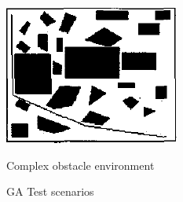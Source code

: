 \begin{figure}[h!]
\begin{minipage}{0.30\textwidth}
        \label{Intermediate obstacle environment}
    \end{minipage}
    \begin{minipage}{0.30\textwidth}
        \centering
        \includegraphics[width=\linewidth]{images/Chap1/R17_complex.png} %
        \caption{Complex obstacle environment}
        \label{Complex obstacle environment}
    \end{minipage}
    \caption{GA Test scenarios \cite{R17}}
    \label{R17 test scenarios}
\end{figure}












